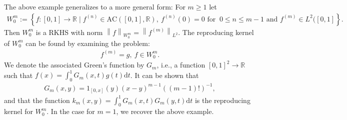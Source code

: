 \documentclass[10pt,twoside,openany,final]{memoir}
\theoremstyle{definition}
\theoremstyle{Break}
\newcommand{\lv}{\left\lVert}
\newcommand{\rv}{\right\rVert}
\newcommand{\R}{\mathbb{R}}
\renewcommand{\d}{\mathrm{d}}
\begin{document}
The above example generalizes to a more general form: For $m\geq 1$ let
\begin{align*}
	W_0^m:= \left\{ f \colon [0,1] \to \R \mid f^{(n)} \in \mathrm{AC}([0,1],\R), \ f^{(n)}(0)=0 \text{ for } \ 0 \leq n \leq m-1 \text{ and } f^{(m)} \in L^2([0,1] \right\}.
\end{align*}
Then $W_0^m$ is a RKHS with norm $\lv f \rv_{W_0^m} = \lv f^{(m)} \rv_{L^2}$. The reproducing kernel of $W_0^m$ can be found by examining the problem:
\begin{align*}
	f^{(m)}=g, \ f \in W_0^m.
\end{align*}
We denote the associated Green's function by $G_m$, i.e., a function $[0,1]^2 \to \R$ such that $f(x) = \int_{0}^1 G_m(x,t)g(t) \d t$.  It can be shown that 
\begin{align*}
	G_m(x,y) = 1_{[0,x]}(y)(x-y)^{m-1}((m-1)!)^{-1},
\end{align*}
 and that the function $k_m(x,y) = \int_{0}^1 G_m(x,t) G_m(y,t) \d t$ is the reproducing kernel for $W_0^m$. In the case for $m=1$, we recover the above example.
\end{document}
